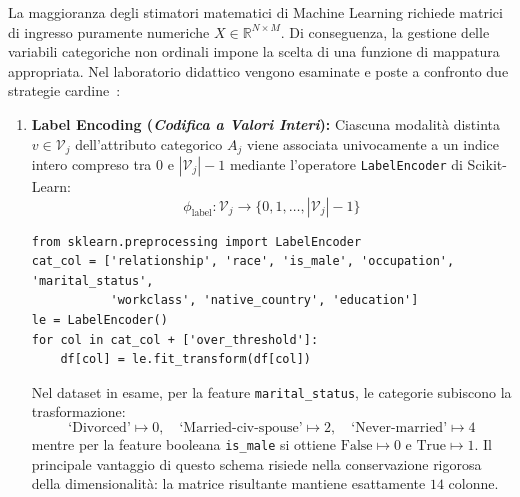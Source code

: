 La maggioranza degli stimatori matematici di Machine Learning richiede matrici di ingresso puramente numeriche $X \in \mathbb{R}^{N \times M}$. Di conseguenza, la gestione delle variabili categoriche non ordinali impone la scelta di una funzione di mappatura appropriata. Nel laboratorio didattico vengono esaminate e poste a confronto due strategie cardine~\cite{mannocci2026imbalanced}:

\begin{enumerate}
    \item \textbf{Label Encoding (\textit{Codifica a Valori Interi}):}
    Ciascuna modalità distinta $v \in \mathcal{V}_j$ dell'attributo categorico $A_j$ viene associata univocamente a un indice intero compreso tra $0$ e $|\mathcal{V}_j| - 1$ mediante l'operatore \texttt{LabelEncoder} di Scikit-Learn:
    \begin{equation}
        \phi_{\text{label}}: \mathcal{V}_j \to \{0, 1, \dots, |\mathcal{V}_j| - 1\}
    \end{equation}
    \begin{lstlisting}[style=pythoncode, caption={Codifica delle variabili categoriche con LabelEncoder.}]
from sklearn.preprocessing import LabelEncoder
cat_col = ['relationship', 'race', 'is_male', 'occupation', 'marital_status',
           'workclass', 'native_country', 'education']
le = LabelEncoder()
for col in cat_col + ['over_threshold']:
    df[col] = le.fit_transform(df[col])
    \end{lstlisting}
    Nel dataset in esame, per la feature \texttt{marital\_status}, le categorie subiscono la trasformazione:
    \begin{equation*}
        \text{`Divorced'} \mapsto 0, \quad \text{`Married-civ-spouse'} \mapsto 2, \quad \text{`Never-married'} \mapsto 4
    \end{equation*}
    mentre per la feature booleana \texttt{is\_male} si ottiene $\text{False} \mapsto 0$ e $\text{True} \mapsto 1$. Il principale vantaggio di questo schema risiede nella conservazione rigorosa della dimensionalità: la matrice risultante mantiene esattamente $14$ colonne.
    

\end{enumerate}
